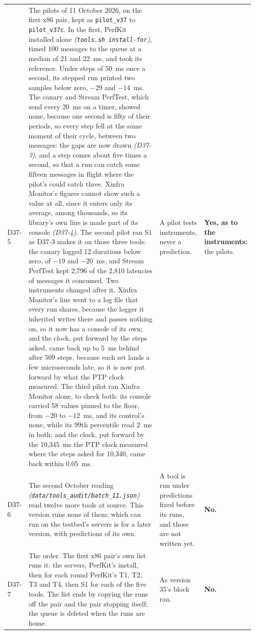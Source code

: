 \documentclass[11pt]{article}
\newcommand{\gl}[1]{{\color{soft}\itshape\small (#1)}}
\begin{document}
{\begin{longtable}{@{}p{1.1cm} >{\raggedright\arraybackslash}p{6.1cm} >{\raggedright\arraybackslash}p{6.0cm} >{\raggedright\arraybackslash}p{2.2cm}@{}}
D37-5 & The pilots of 11 October 2026, on the first x86 pair, kept as \texttt{pilot\_v37} to \texttt{pilot\_v37c}. In the first, PerfKit installed alone \gl{\texttt{tools.sh install-for}}, timed 100 messages to the queue at a median of 21 and 22~ms, and took its reference. Under steps of 50~ms once a second, its stepped run printed two samples below zero, $-29$ and $-14$~ms. The canary and Stream PerfTest, which send every 20~ms on a timer, showed none, because one second is fifty of their periods, so every step fell at the same moment of their cycle, between two messages: the gaps are now drawn \gl{D37-3}, and a step comes about five times a second, so that a run can catch some fifteen messages in flight where the pilot's could catch three. Xinfra Monitor's figures cannot show such a value at all, since it enters only its average, among thousands, so its library's own line is made part of its console \gl{D37-4}. The second pilot ran S1 as D37-3 makes it on those three tools: the canary logged 12 durations below zero, of $-19$ and $-20$~ms, and Stream PerfTest kept 2,796 of the 2,810 latencies of messages it consumed. Two instruments changed after it. Xinfra Monitor's line went to a log file that every run shares, because the logger it inherited writes there and passes nothing on, so it now has a console of its own; and the clock, put forward by the steps asked, came back up to 5~ms behind after 509 steps, because each set lands a few microseconds late, so it is now put forward by what the PTP clock measured. The third pilot ran Xinfra Monitor alone, to check both: its console carried 58 values pinned to the floor, from $-20$ to $-12$~ms, and its control's none, while its 99th percentile read 2~ms in both; and the clock, put forward by the 10,345~ms the PTP clock measured where the steps asked for 10,340, came back within 0.05~ms. & A pilot tests instruments, never a prediction. & \textbf{Yes, as to the instruments:} the pilots. \\
D37-6 & The second October reading \gl{\texttt{data/tools\_audit/batch\_11.json}} read twelve more tools at source. This version runs none of them; which can run on the testbed's servers is for a later version, with predictions of its own. & A tool is run under predictions fixed before its runs, and those are not written yet. & \textbf{No.} \\
D37-7 & The order. The first x86 pair's own list runs it: the servers, PerfKit's install, then for each round PerfKit's T1, T2, T3 and T4, then S1 for each of the five tools. The list ends by copying the runs off the pair and the pair stopping itself; the queue is deleted when the runs are home. & As version 35's block ran. & \textbf{No.} \\
\bottomrule
\end{longtable}}
\end{document}
